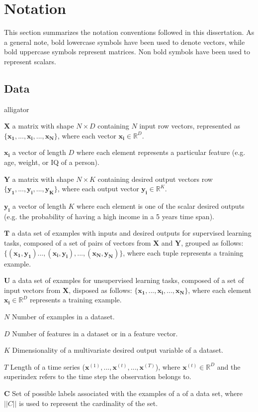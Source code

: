 \chapter*{Notation} \label{ch:notation}
This section summarizes the notation conventions followed in this dissertation. As a general note, bold lowercase symbols have been used to denote vectors, while bold uppercase symbols represent matrices. Non bold symbols have been used to represent scalars. 

\section*{Data}

\begin{labeling}{alligator}
	\item [$\mathbf{X}$] a matrix with shape $N \times D$ containing $N$ input row vectors, represented as $\{\mathbf{x_1},...,\mathbf{x_i},...,\mathbf{x_N}\}$, where each vector $\mathbf{x_i} \in \mathbb{R}^D$.
	\item [$\mathbf{x_i}$] a vector of length $D$ where each element represents a particular feature (e.g. age, weight, or IQ of a person).
	\item [$\mathbf{Y}$] a matrix with shape $N \times K$ containing desired output vectors row $\{\mathbf{y_1},...,\mathbf{y_i},...,\mathbf{y_K}\}$, where each output vector $\mathbf{y_i} \in \mathbb{R}^K$.
	\item [$\mathbf{y_i}$]  a vector of length $K$ where each element is one of the scalar desired outputs (e.g. the probability of having a high income in a 5 years time span).
	\item [$\mathbf{T}$] a data set  of examples with inputs and desired outputs for supervised learning tasks, composed of a set of pairs of vectors from $\mathbf{X}$ and $\mathbf{Y}$, grouped as follows: $\{(\mathbf{x_1}, \mathbf{y_1})...,(\mathbf{x_i}, \mathbf{y_i}),...,(\mathbf{x_N}, \mathbf{y_N})\}$, where each tuple represents a training example.
	\item [$\mathbf{U}$] a data set of examples for unsupervised learning tasks, composed of a set of input vectors from $\mathbf{X}$, disposed as follows: $\{\mathbf{x_1},...,\mathbf{x_i},...,\mathbf{x_N}\}$, where each element $\mathbf{x_i} \in \mathbb{R}^D$ represents a training example.
	\item [$N$] Number of examples in a dataset.
	\item [$D$]  Number of features in a dataset or in a feature vector.
	\item [$K$] Dimensionality of a multivariate desired output variable of a dataset.
	\item [$T$] Length of a time series ($\mathbf{x}^{(1)}, ..., \mathbf{x}^{(t)}, ..., \mathbf{x}^{(T)}$), where $\mathbf{x}^{(t)} \in \mathbb{R}^D$ and the superindex refers to the time step the observation belongs to.
	\item [$\mathbf{C}$] Set of possible labels associated with the examples of a of a data set, where $||C||$ is used to represent the cardinality of the set.
\end{labeling}

